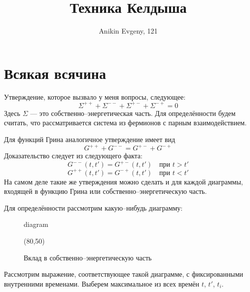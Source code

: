 \documentclass{article}
\title{Техника Келдыша}
\author{Anikin Evgeny, 121}
\begin{document}
\maketitle
\section{Всякая всячина}
Утверждение, которое вызвало у меня вопросы, следующее:
\begin{equation}
	\Sigma^{++} + \Sigma^{--} + \Sigma^{+-} + \Sigma^{-+} = 0
\end{equation}
Здесь $\Sigma$ --- это собственно--энергетическая часть. Для определённости
будем считать, что рассматривается система из фермионов с парным 
взаимодействием.

Для функций Грина аналогичное утверждение имеет вид
\begin{equation}
	G^{++} + G^{--} = G^{+-} + G^{-+} 
\end{equation}
Доказательство следует из следующего факта:
\begin{equation}
	G^{--}(t,t') = G^{+-}(t,t') \quad \mbox{при } t > t'
\end{equation}
\begin{equation}
	G^{++}(t,t') = G^{-+}(t,t') \quad \mbox{при } t < t'
\end{equation}
На самом деле такие же утверждения можно сделать и для каждой диаграммы,
входящей в функцию Грина или собственно--энергетическую часть.

Для определённости рассмотрим какую--нибудь диаграмму:

\begin{figure}[h]	
	\centering
	\begin{fmffile}{diagram}
		\begin{fmfgraph*}(80,50)


			\fmffreeze

			\fmffreeze

			
		\end{fmfgraph*}
	\end{fmffile}
	\caption{Вклад в собственно--энергетическую часть}
\end{figure}
Рассмотрим выражение, соответствующее такой диаграмме, с фиксированными
внутренними временами. Выберем максимальное из всех времён $t$, $t'$, $t_i$.
\end{document}

